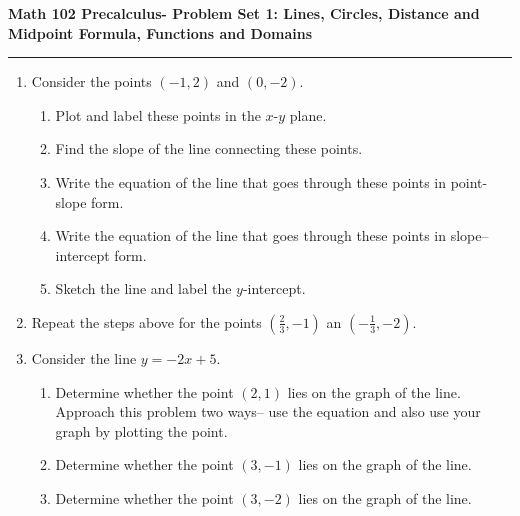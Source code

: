 \documentclass[12pt]{amsart}
\newcommand{\class}{Math 102}
\newcommand{\term}{Precalculus}
\newcommand{\quiztitle}{Problem Set 1: Lines, Circles, Distance and Midpoint Formula, Functions and Domains}
\begin{document}
\textbf{\class \xspace\xspace \term \xspace\xspace - \quiztitle\\}
\rule[1ex]{\textwidth}{.1pt}


\vspace{1em}

\begin{enumerate}

\item Consider the points $(-1,2)$ and $(0,-2)$.
\begin{enumerate}
     \item Plot and label these points in the $x$-$y$ plane.
     \item Find the slope of the line connecting these points.
     \item Write the equation of the line that goes through these points in point-slope form.
     \item Write the equation of the line that goes through these points in slope--intercept form.
     \item Sketch the line and label the $y$-intercept.
    \end{enumerate}

\item Repeat the steps above for the points $(\frac{2}{3},-1)$ an $(-\frac{1}{3},-2)$.

 \item Consider the line $y=-2x+5$.
  \begin{enumerate}
     \item Determine whether the point $(2,1)$ lies on the graph of the line.  Approach this problem two ways-- use the equation and also use your graph by plotting the point.
     \item Determine whether the point $(3,-1)$ lies on the graph of the line.
     \item Determine whether the point $(3,-2)$ lies on the graph of the line.
      \end{enumerate}


\end{enumerate}
\end{document}
